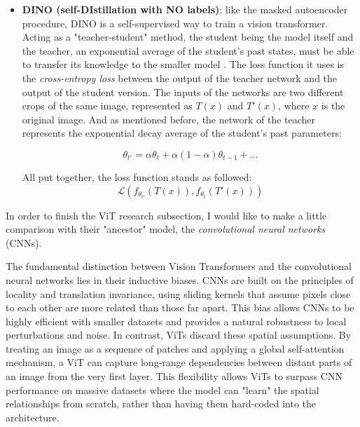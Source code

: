 \begin{itemize}
	\item \textbf{DINO (self-DIstillation with NO labels)}: like the masked autoencoder procedure, DINO is a self-supervised way to train a vision transformer. Acting as a "teacher-student" method, the student being the model itself and the teacher, an exponential average of the student's past states, must be able to transfer its knowledge to the smaller model \cite{wiki:knowledge_distillation}. The loss function it uses is the \textit{cross-entropy loss} between the output of the teacher network and the output of the student version. The inputs of the networks are two different crops of the same image, represented as $T(x)$ and $T'(x)$, where $x$ is the original image. And as mentioned before, the network of the teacher represents the exponential decay average of the student's past parameters: 
	
	\begin{equation}
		\theta_{t'} = \alpha \theta_t + \alpha(1 - \alpha) \theta_{t-1} + \dots
	\end{equation}
	
	All put together, the loss function stands as followed:
	\begin{equation}
		\mathcal{L}(f_{\theta_{t'}}(T(x)), f_{\theta_{t}}(T'(x)))
	\end{equation}
	
	
\end{itemize}

In order to finish the ViT research subsection, I would like to make a little comparison with their "ancestor" model, the \textit{convolutional neural networks} (CNNs).

The fundamental distinction between Vision Transformers and the convolutional neural networks lies in their inductive biases. CNNs are built on the principles of locality and translation invariance, using sliding kernels that assume pixels close to each other are more related than those far apart. This bias allows CNNs to be highly efficient with smaller datasets and provides a natural robustness to local perturbations and noise. In contrast, ViTs discard these spatial assumptions. By treating an image as a sequence of patches and applying a global self-attention mechanism, a ViT can capture long-range dependencies between distant parts of an image from the very first layer. This flexibility allows ViTs to surpass CNN performance on massive datasets where the model can "learn" the spatial relationships from scratch, rather than having them hard-coded into the architecture.

